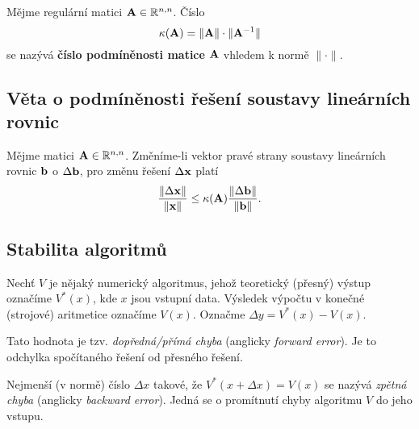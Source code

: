 Mějme regulární matici $\mathbf{A} \in \mathbb{R}^{n,n}$. Číslo
\[ \kappa(\mathbf{A}) = \|\mathbf{A}\| \cdot \| \mathbf{A}^{-1} \| \]
se nazývá \textbf{číslo podmíněnosti matice} $\mathbf{A}$ vhledem k normě $\|\cdot\|$.

\subsection*{Věta o podmíněnosti řešení soustavy lineárních rovnic}

Mějme matici $\mathbf{A} \in \mathbb{R}^{n,n}$. Změníme-li vektor pravé strany soustavy
lineárních rovnic $\mathbf{b}$ o $\Delta \mathbf{b}$, pro změnu řešení $\Delta \mathbf{x}$ platí
\[ \frac{\| \Delta \mathbf{x} \|}{\| \mathbf{x} \|} \leq \kappa(\mathbf{A}) \frac{\| \Delta \mathbf{b} \|}{\| \mathbf{b} \|}. \]

\subsection*{Stabilita algoritmů}

Nechť $V$ je nějaký numerický algoritmus, jehož teoretický (přesný) výstup
označíme $V^*(x)$, kde $x$ jsou vstupní data. Výsledek výpočtu v konečné
(strojové) aritmetice označíme $V(x)$. Označme $\Delta y = V^*(x) - V(x)$.

Tato hodnota je tzv. \emph{dopředná/přímá chyba} (anglicky \emph{forward
	error}). Je to odchylka spočítaného řešení od přesného řešení.

Nejmenší (v normě) číslo $\Delta x$ takové, že $V^*(x + \Delta x) = V(x)$ se
nazývá \emph{zpětná chyba} (anglicky \emph{backward error}). Jedná se o
promítnutí chyby algoritmu $V$ do jeho vstupu.

\pagebreak